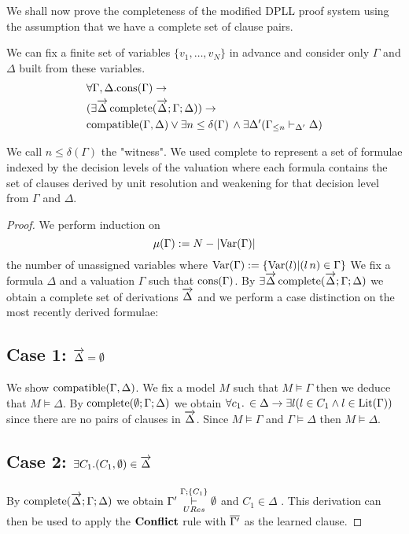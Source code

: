 We shall now prove the completeness of the modified DPLL proof system using the assumption that we have a complete set of clause pairs.\\
\medskip
\begin{mytheorem} 
We can fix a finite set of variables $\{v_1, \ldots , v_N \}$ in advance and consider only $\Gamma$ and $\Delta$ built from these variables.
\begin{align*}
 &\forall \Gamma, \Delta. \mathrm{cons}(\Gamma) \to   \\ 
& (\exists \overrightarrow{\Delta} \, \mathrm{complete}(\overrightarrow{\Delta};\Gamma; \Delta)) \to \\
&\mathrm{compatible}(\Gamma,\Delta) \vee  \exists n \leq \delta(\Gamma) \, \wedge  \exists \Delta' ( \Gamma_{\leq n}  \vdash_{\Delta'} \Delta)
\end{align*}

We call $n \leq \delta(\Gamma)$  the "witness". We used $\mathrm{complete}$ to represent a set of formulae indexed by the decision levels of the valuation where each formula  contains the set of clauses derived by unit resolution and weakening for that decision level from $\Gamma$ and $\Delta$.
%

\begin{proof}
We perform induction on  
$$\mu(\Gamma) := N - |\mathrm{Var}(\Gamma)|$$
the number of unassigned variables where $\mathrm{Var}(\Gamma) := \{\mathrm{Var}(l)| (l \, n) \in \Gamma \}$
%
We fix a formula $\Delta$ and a valuation $\Gamma$ such that $\mathrm{cons}(\Gamma)$. By $\exists \overrightarrow{\Delta} \, \mathrm{complete}(\overrightarrow{\Delta};\Gamma; \Delta) $ we obtain a complete set of derivations $\overrightarrow{\Delta}$ and we perform a case distinction on the most recently derived formulae:

\subsection*{Case 1: $\overrightarrow{\Delta} = \emptyset$}
We show $\mathrm{compatible}(\Gamma,\Delta)$. We fix a model $M$ such that $M \models \Gamma$ then we  deduce that $M \models \Delta$. By $\mathrm{complete}(\emptyset;\Gamma; \Delta)$ we obtain $\forall c_1. \, \in \Delta \to \exists l( l \in C_1 \wedge l \in \mathrm{Lit}(\Gamma))$ since there are no pairs of clauses in $\overrightarrow{\Delta}$. Since $M \models \Gamma$ and $\Gamma \models \Delta$ then $M \models \Delta$.

\subsection*{Case 2: $\exists C_1. (C_1, \emptyset) \in \overrightarrow{\Delta}$}
By $\mathrm{complete}(\overrightarrow{\Delta};\Gamma; \Delta)$ we obtain $\Gamma' \overset{\Gamma;\{ C_1 \} }{\underset{URes}{\vdash}} \emptyset$ and $C_1 \in \Delta$ . This derivation can then be used to apply the $\mathbf{Conflict}$ rule with $\overline{\Gamma'}$ as the learned clause. 
%

\end{proof}
\end{mytheorem}
